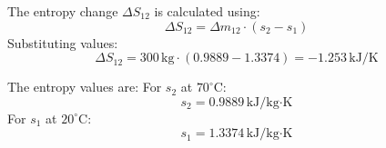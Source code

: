 The entropy change \( \Delta S_{12} \) is calculated using:  
\[
\Delta S_{12} = \Delta m_{12} \cdot (s_{2} - s_{1})
\]  
Substituting values:  
\[
\Delta S_{12} = 300 \, \text{kg} \cdot (0.9889 - 1.3374) = -1.253 \, \text{kJ/K}
\]  

The entropy values are:  
For \( s_{2} \) at \( 70^\circ\text{C} \):  
\[
s_{2} = 0.9889 \, \text{kJ/kg·K}
\]  
For \( s_{1} \) at \( 20^\circ\text{C} \):  
\[
s_{1} = 1.3374 \, \text{kJ/kg·K}
\]